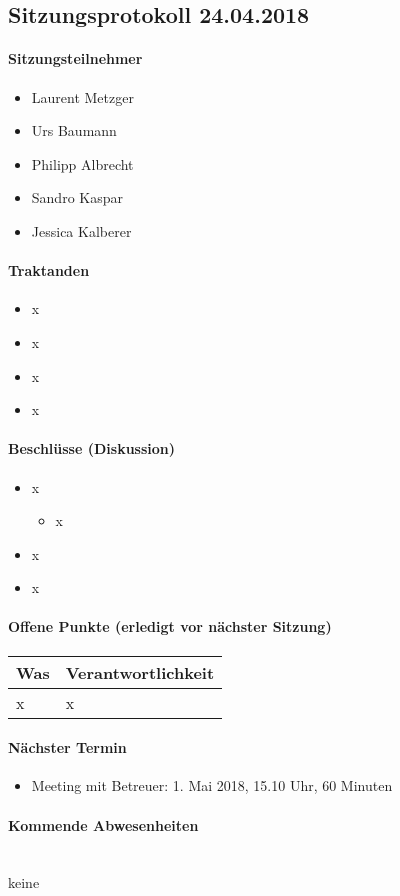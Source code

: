 \subsection{Sitzungsprotokoll 24.04.2018}

\paragraph{Sitzungsteilnehmer}
\begin{itemize}	
	\item Laurent Metzger 
	\item Urs Baumann
	\item Philipp Albrecht
	\item Sandro Kaspar
	\item Jessica Kalberer
\end{itemize}

\paragraph{Traktanden}
\begin{itemize}	
	\item x
	\item x
	\item x
	\item x
\end{itemize}

\paragraph{Beschlüsse (Diskussion)}
\begin{itemize}	
	\item x
	\begin{itemize}
		\item x
	\end{itemize}
	\item x
	\item x
\end{itemize}

\paragraph{Offene Punkte (erledigt vor nächster Sitzung)} \mbox{}

\begin{table}[H]
	\centering
	\begin{tabularx}{\textwidth}{X | p{4.5cm}}
		\rowcolor{gray!50}
		\textbf{Was} & \textbf{Verantwortlichkeit} \\
		\hline
		x & x \\	
	\end{tabularx}
	\label{tab:my-label}
\end{table}

\paragraph{Nächster Termin}
\begin{itemize}	
	\item Meeting mit Betreuer: 1. Mai 2018, 15.10 Uhr, 60 Minuten
\end{itemize}

\paragraph{Kommende Abwesenheiten} \mbox{}\\
keine
